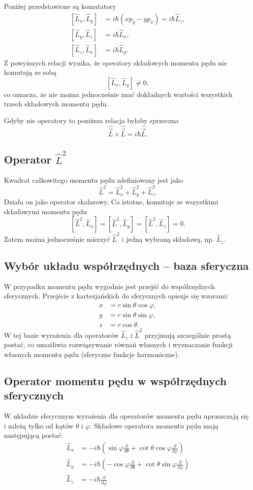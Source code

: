 Poniżej przedstawione są komutatory
$$
\begin{aligned}
  [\hat{L}_x, \hat{L}_y] &= i\hbar(xp_y - yp_x) = i \hbar \hat{L}_z, \\
  [\hat{L}_y, \hat{L}_z] &= i \hbar \hat{L}_x, \\
  [\hat{L}_z, \hat{L}_x] &= i \hbar \hat{L}_y.
\end{aligned}
$$
Z powyższych relacji wynika, że operatory składowych momentu pędu nie komutują ze sobą
$$
[\hat{L}_x, \hat{L}_y] \neq 0,
$$
co oznacza, że nie można jednocześnie znać dokładnych wartości wszystkich trzech składowych momentu pędu.

Gdyby nie operatory to poniższa relacja byłaby sprzeczna
$$
\hat{\vec{L}} \times \hat{\vec{L}} = i\hbar \hat{\vec{L}}.
$$

\subsection{Operator $\hat{L}^2$}
Kwadrat całkowitego momentu pędu zdefiniowany jest jako
$$
\hat{L}^2 = \hat{L}_x^2 + \hat{L}_y^2 + \hat{L}_z^2.
$$
Działa on jako operator skalarowy. Co istotne, komutuje ze wszystkimi składowymi momentu pędu
$$
[\hat{L}^2, \hat{L}_x] = [\hat{L}^2, \hat{L}_y] = [\hat{L}^2, \hat{L}_z] = 0.
$$
Zatem można jednocześnie mierzyć $\hat{L}^2$ i jedną wybraną składową, np. $\hat{L}_z$.

\subsection{Wybór układu współrzędnych -- baza sferyczna}
W przypadku momentu pędu wygodnie jest przejść do współrzędnych sferycznych. Przejście z kartezjańskich do sferycznych opisuje się wzorami:
$$
\begin{aligned}
x &= r \sin \theta \cos \varphi, \\
y &= r \sin \theta \sin \varphi, \\
z &= r \cos \theta.
\end{aligned}
$$
W tej bazie wyrażenia dla operatorów $\hat{L}_z$ i $\hat{L}^2$ przyjmują szczególnie prostą postać, co umożliwia rozwiązywanie równań własnych i wyznaczanie funkcji własnych momentu pędu (sferyczne funkcje harmoniczne).


\subsection{Operator momentu pędu w współrzędnych sferycznych}
W układzie sferycznym wyrażenia dla operatorów momentu pędu upraszczają się i zależą tylko od kątów $\theta$ i $\varphi$. Składowe operatora momentu pędu mają następującą postać:
$$
\begin{aligned}
\hat{L}_x &= -i\hbar \left( \sin\varphi \frac{\partial}{\partial\theta} + \cot\theta \cos\varphi \frac{\partial}{\partial\varphi} \right) \\
\hat{L}_y &= -i\hbar \left( -\cos\varphi \frac{\partial}{\partial\theta} + \cot\theta \sin\varphi \frac{\partial}{\partial\varphi} \right) \\
\hat{L}_z &= -i\hbar \frac{\partial}{\partial\varphi}
\end{aligned}
$$

